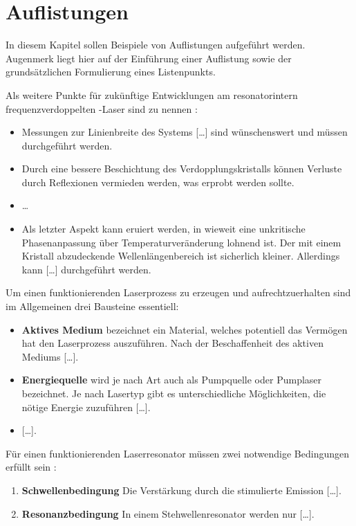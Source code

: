 \chapter{Auflistungen}
\label{sec:auflistungen}

In diesem Kapitel sollen Beispiele von Auflistungen aufgeführt werden. Augenmerk liegt hier auf der Einführung einer Auflistung sowie der grundsätzlichen Formulierung eines Listenpunkts. 

Als weitere Punkte für zukünftige Entwicklungen am resonatorintern frequenzverdoppelten \tisa-Laser sind zu nennen \cite{Naubereit.2012}: 

\begin{itemize}
	\item Messungen zur Linienbreite des Systems [\dots] sind wünschenswert und müssen durchgeführt werden. 
	\item Durch eine bessere Beschichtung des Verdopplungskristalls können Verluste durch Reflexionen vermieden werden, was erprobt werden sollte. 
	\item \dots
	\item Als letzter Aspekt kann eruiert werden, in wieweit eine unkritische Phasenanpassung über Temperaturveränderung lohnend ist. Der mit einem Kristall abzudeckende Wellenlängenbereich ist sicherlich kleiner. Allerdings kann [\dots] durchgeführt werden. 
\end{itemize}

Um einen funktionierenden Laserprozess zu erzeugen \cite{Naubereit.2014} und aufrechtzuerhalten sind im Allgemeinen drei Bausteine essentiell: 

\begin{itemize}
	\item \textbf{Aktives Medium} bezeichnet ein Material, welches potentiell das Vermögen hat den Laserprozess auszuführen. Nach der Beschaffenheit des aktiven Mediums [\dots]. 
	\item \textbf{Energiequelle} wird je nach Art auch als Pumpquelle oder Pumplaser bezeichnet. Je nach Lasertyp gibt es unterschiedliche Möglichkeiten, die nötige Energie zuzuführen [\dots].
	\item{} [\dots].
\end{itemize}

Für einen funktionierenden Laserresonator müssen zwei notwendige Bedingungen erfüllt sein \cite{Naubereit.2014}: 
\begin{enumerate}
	\item \textbf{Schwellenbedingung} Die Verstärkung durch die stimulierte Emission [\dots]. 
	\item \textbf{Resonanzbedingung} In einem Stehwellenresonator werden nur [\dots]. 
\end{enumerate}